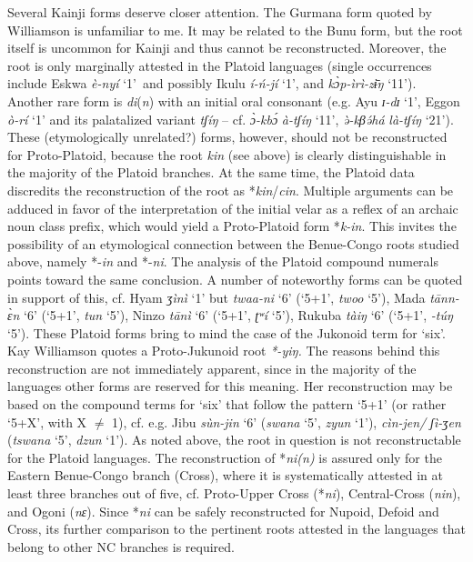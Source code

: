 Several Kainji forms deserve closer attention. The Gurmana form quoted by Williamson is unfamiliar to me. It may be related to the Bunu form, but the root itself is uncommon for Kainji and thus cannot be reconstructed. Moreover, the root is only marginally attested in the Platoid languages (single occurrences include Eskwa \textit{è-nyí} ‘1’~and possibly Ikulu \textit{í-ń-jí} ‘1’, and \textit{k{\`{ɔ}}p-ìrì-z{\={ɨ}}ŋ} ‘11’). Another rare form is \textit{di}(\textit{n}) with an initial oral consonant (e.g. Ayu \textit{ɪ-dɪ} ‘1’, Eggon \textit{ò-rí} ‘1’ and its palatalized variant \textit{tʃíŋ} – cf. \textit{{\`{ɔ}}-kb{\'{ɔ}}} \textit{à-tʃíŋ} ‘11’, \textit{{\`{ə}}-kβ}\textit{{\'{ə}}há} \textit{là-tʃíŋ} ‘21’). These (etymologically unrelated?) forms, however, should not be reconstructed for Proto-Platoid, because the root \textit{kin} (see above) is clearly distinguishable in the majority of the Platoid branches. At the same time, the Platoid data discredits the reconstruction of the root as *\textit{kin}/\textit{cin}. Multiple arguments can be adduced in favor of the interpretation of the initial velar as a reflex of an archaic noun class prefix, which would yield a Proto-Platoid form *\textit{k-in}. This invites the possibility of an etymological connection between the Benue-Congo roots studied above, namely *-\textit{in} and *-\textit{ni}. The analysis of the Platoid compound numerals points toward the same conclusion. A number of noteworthy forms can be quoted in support of this, cf.  Hyam \textit{ʒìnì} ‘1’ but \textit{twaa-ni} ‘6’ (‘5+1’, \textit{twoo} ‘5’), Mada \textit{tānn-{\`{ɛ}}n} ‘6’ (‘5+1’, \textit{tun} ‘5’), Ninzo \textit{tānì} ‘6’ (‘5+1’, \textit{ʈʷí} ‘5’), Rukuba \textit{tàiŋ} ‘6’ (‘5+1’, \textit{-túŋ} ‘5’). These Platoid forms bring to mind the case of the Jukonoid term for ‘six’. Kay Williamson quotes a Proto-Jukunoid root \textit{*-yiŋ.} The reasons behind this reconstruction are not immediately apparent, since in the majority of the languages other forms are reserved for this meaning. Her reconstruction may be based on the compound terms for ‘six’ that follow the pattern ‘5+1’ (or rather ‘5+X’, with X ${\neq}$ 1), cf. e.g. Jibu \textit{sùn-jin} ‘6’ (\textit{swana} ‘5’, \textit{zyun} ‘1’), \textit{cìn-jen/} \textit{ʃì-ʒen} (\textit{tswana} ‘5’, \textit{dzun} ‘1’). As noted above, the root in question is not reconstructable for the Platoid languages. The reconstruction of *\textit{ni(n)} is assured only for the Eastern Benue-Congo branch (Cross), where it is systematically attested in at least three branches out of five, cf. Proto-Upper Cross (*\textit{ni}), Central-Cross (\textit{nin}), and Ogoni (\textit{nɛ}). Since *\textit{ni} can be safely reconstructed for Nupoid, Defoid and Cross, its further comparison to the pertinent roots attested in the languages that belong to other NC branches is required.


